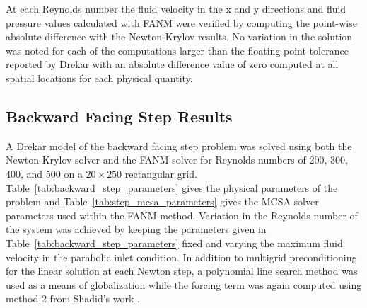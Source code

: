 At each Reynolds number the fluid velocity in the x and y directions
and fluid pressure values calculated with FANM were verified by
computing the point-wise absolute difference with the Newton-Krylov
results. No variation in the solution was noted for each of the
computations larger than the floating point tolerance reported by
Drekar with an absolute difference value of zero computed at all
spatial locations for each physical quantity.

\subsection{Backward Facing Step Results}
\label{subsec:backward_step_verification}

A Drekar model of the backward facing step problem was solved using
both the Newton-Krylov solver and the FANM solver for Reynolds numbers
of 200, 300, 400, and 500 on a $20 \times 250$ rectangular
grid. Table~\ref{tab:backward_step_parameters} gives the physical
parameters of the problem and Table~\ref{tab:step_mcsa_parameters}
gives the MCSA solver parameters used within the FANM
method. Variation in the Reynolds number of the system was achieved by
keeping the parameters given in
Table~\ref{tab:backward_step_parameters} fixed and varying the maximum
fluid velocity in the parabolic inlet condition. In addition to
multigrid preconditioning for the linear solution at each Newton step,
a polynomial line search method was used as a means of globalization
while the forcing term was again computed using method 2 from Shadid's
work \cite{shadid_inexact_1997}.

